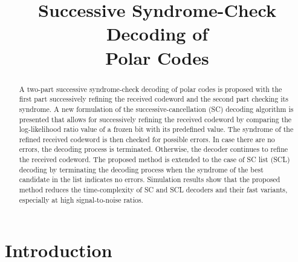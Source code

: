\documentclass[conference]{IEEEtran}
\begin{document}

\title{Successive Syndrome-Check Decoding of\\Polar Codes}

\author{

}
\maketitle

\begin{abstract}
A two-part successive syndrome-check decoding of polar codes is proposed with the first part successively refining the received codeword and the second part checking its syndrome. A new formulation of the successive-cancellation (SC) decoding algorithm is presented that allows for successively refining the received codeword by comparing the log-likelihood ratio value of a frozen bit with its predefined value. The syndrome of the refined received codeword is then checked for possible errors. In case there are no errors, the decoding process is terminated. Otherwise, the decoder continues to refine the received codeword. The proposed method is extended to the case of SC list (SCL) decoding by terminating the decoding process when the syndrome of the best candidate in the list indicates no errors. Simulation results show that the proposed method reduces the time-complexity of SC and SCL decoders and their fast variants, especially at high signal-to-noise ratios.
\end{abstract}

\IEEEpeerreviewmaketitle

\section{Introduction}
\end{document}
